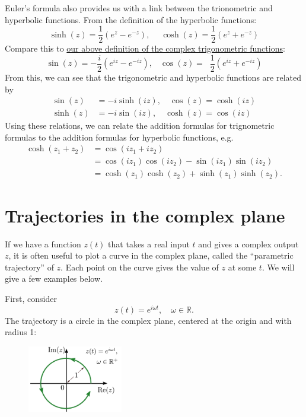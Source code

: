 \documentclass[10pt,a4paper]{article}
\begin{document}
Euler's formula also provides us with a link between the trionometric
and hyperbolic functions. From the definition of the hyperbolic
functions:
\begin{equation}
\sinh(z) = \frac{1}{2}\left(e^{z} - e^{-z}\right), \quad\;
\cosh(z) = \frac{1}{2}\left(e^{z} + e^{-z}\right)
\end{equation}
Compare this to \hyperref[complex-trigo]{our above definition of the
  complex trigonometric functions}:
\begin{equation}
\sin(z) = -\frac{i}{2}\left(e^{iz} - e^{-iz}\right), \;\;\; \cos(z) = \;\;\frac{1}{2}\left(e^{iz} + e^{-iz}\right)
\end{equation}
From this, we can see that the trigonometric and hyperbolic functions
are related by
\begin{align}
\sin(z) &= -i \sinh(iz), \quad \cos(z) = \cosh(iz) \\
\sinh(z) &= -i \sin(iz), \quad \cosh(z) = \cos(iz)
\end{align}
Using these relations, we can relate the addition formulas for
trignometric formulas to the addition formulas for hyperbolic
functions, e.g.
\begin{align}
  \cosh(z_1+z_2) &= \cos(iz_1 + iz_2) \\
  &= \cos(iz_1)\cos(iz_2) - \sin(iz_1)\sin(iz_2) \\
  &= \cosh(z_1)\cosh(z_2) + \sinh(z_1)\sinh(z_2).
\end{align}

\section{Trajectories in the complex plane}
\label{trajectories-in-the-complex-plane}

If we have a function $z(t)$ that takes a real input $t$ and gives a
complex output $z$, it is often useful to plot a curve in the complex
plane, called the ``parametric trajectory'' of $z$. Each point on the
curve gives the value of $z$ at some $t$. We will give a few examples
below.

First, consider
\begin{equation}
  z(t) = e^{i\omega t}, \quad \omega \in \mathbb{R}.
\end{equation}
The trajectory is a circle in the complex plane, centered at the
origin and with radius 1:

\begin{figure}[h]
  \centering\includegraphics[width=0.37\textwidth]{complex_trajectory_1}
\end{figure}
\end{document}
